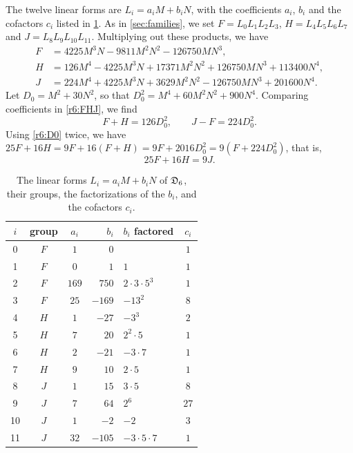 The twelve linear forms are $L_i=a_iM+b_iN$, with the coefficients $a_i$, $b_i$ and the cofactors $c_i$ listed in \cref{tab:r6-forms}. As in \cref{sec:families}, we set $F=L_0L_1L_2L_3$, $H=L_4L_5L_6L_7$ and $J=L_8L_9L_{10}L_{11}$. Multiplying out these products, we have
\begin{equation}\label{r6:FHJ}
\begin{aligned}
F&=4225M^3N-9811M^2N^2-126750MN^3,\\
H&=126M^4-4225M^3N+17371M^2N^2+126750MN^3+113400N^4,\\
J&=224M^4+4225M^3N+3629M^2N^2-126750MN^3+201600N^4.
\end{aligned}
\end{equation}
Let $D_0=M^2+30N^2$, so that $D_0^2=M^4+60M^2N^2+900N^4$. Comparing coefficients in \eqref{r6:FHJ}, we find
\begin{equation}\label{r6:D0}
F+H=126D_0^2,\qquad J-F=224D_0^2.
\end{equation}
Using \eqref{r6:D0} twice, we have $25F+16H=9F+16(F+H)=9F+2016D_0^2=9(F+224D_0^2)$, that is,
\begin{equation}\label{r6:identity}
25F+16H=9J.
\end{equation}

\begin{table}[htbp]
\centering
\caption{The linear forms $L_i=a_iM+b_iN$ of $\mathfrak D_6$, their groups, the factorizations of the $b_i$, and the cofactors $c_i$.}
\label{tab:r6-forms}
\begin{tabular}{cccrlc}
\toprule
$i$ & group & $a_i$ & $b_i$ & $b_i$ factored & $c_i$\\
\midrule
0 & $F$ & $1$ & $0$ & & $1$ \\
1 & $F$ & $0$ & $1$ & $1$ & $1$ \\
2 & $F$ & $169$ & $750$ & $2\cdot3\cdot5^{3}$ & $1$ \\
3 & $F$ & $25$ & $-169$ & $-13^{2}$ & $8$ \\
4 & $H$ & $1$ & $-27$ & $-3^{3}$ & $2$ \\
5 & $H$ & $7$ & $20$ & $2^{2}\cdot5$ & $1$ \\
6 & $H$ & $2$ & $-21$ & $-3\cdot7$ & $1$ \\
7 & $H$ & $9$ & $10$ & $2\cdot5$ & $1$ \\
8 & $J$ & $1$ & $15$ & $3\cdot5$ & $8$ \\
9 & $J$ & $7$ & $64$ & $2^{6}$ & $27$ \\
10 & $J$ & $1$ & $-2$ & $-2$ & $3$ \\
11 & $J$ & $32$ & $-105$ & $-3\cdot5\cdot7$ & $1$ \\
\bottomrule
\end{tabular}
\end{table}

